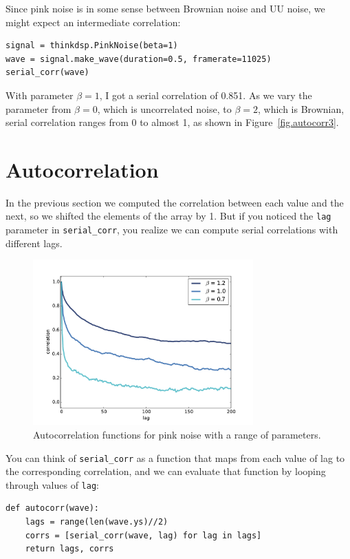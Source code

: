 \documentclass[12pt]{book}
\begin{document}
Since pink noise is in some sense between Brownian noise and UU noise,
we might expect an intermediate correlation:

\begin{verbatim}
signal = thinkdsp.PinkNoise(beta=1)
wave = signal.make_wave(duration=0.5, framerate=11025)
serial_corr(wave)
\end{verbatim}

With parameter $\beta=1$, I got a serial correlation of 0.851.
As we vary the parameter from $\beta=0$, which is uncorrelated
noise, to $\beta=2$, which is Brownian, serial correlation
ranges from 0 to almost 1, as shown in Figure~\ref{fig.autocorr3}.


\section{Autocorrelation}

In the previous section we computed the correlation between each
value and the next, so we shifted the elements of the array by 1.
But if you noticed the {\tt lag} parameter in \verb"serial_corr",
you realize we can compute serial correlations with
different lags.

\begin{figure}
\centerline{\includegraphics[height=2.5in]{figs/autocorr4.pdf}}
\caption{Autocorrelation functions for pink noise with a range
of parameters.}
\label{fig.autocorr4}
\end{figure}

You can think of \verb"serial_corr" as a function that
maps from each value of lag to the corresponding correlation, and we
can evaluate that function by looping through values of {\tt lag}:

\begin{verbatim}
def autocorr(wave):
    lags = range(len(wave.ys)//2)
    corrs = [serial_corr(wave, lag) for lag in lags]
    return lags, corrs
\end{verbatim}
\end{document}
